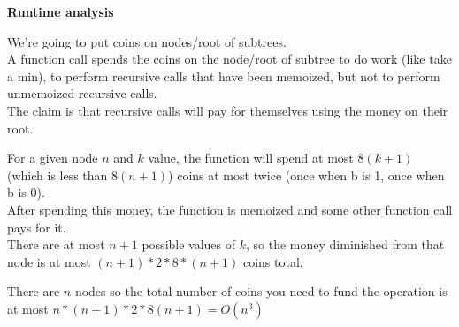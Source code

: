 \documentclass[11pt]{article}
\begin{document}
\textbf{Runtime analysis}

We're going to put coins on nodes/root of subtrees.\\
A function call spends the coins on the node/root of subtree to do work (like take a min), to perform recursive calls that have been memoized, but not to perform unmemoized recursive calls.\\
The claim is that recursive calls will pay for themselves using the money on their root.

For a given node $n$ and $k$ value, the function will spend at most $8(k+1)$ (which is less than $8(n+1)$) coins at most twice (once when b is 1, once when b is 0).\\
After spending this money, the function is memoized and some other function call pays for it.\\
There are at most $n+1$ possible values of $k$, so the money diminished from that node is at most $(n+1)*2*8*(n+1)$ coins total.

There are $n$ nodes so the total number of coins you need to fund the operation is at most $n*(n+1)*2*8(n+1) = O(n^3)$
\end{document}
